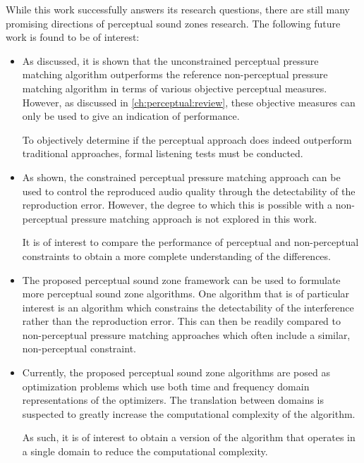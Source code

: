 While this work successfully answers its research questions, 
there are still many promising directions of perceptual sound zones research.
The following future work is found to be of interest:
\begin{itemize}
    \item As discussed, it is shown that the unconstrained perceptual pressure matching algorithm outperforms 
        the reference non-perceptual pressure matching algorithm in terms of various objective perceptual measures.
        However, as discussed in \autoref{ch:perceptual:review}, 
        these objective measures can only be used to give an indication of performance.

        To objectively determine if the perceptual approach does indeed outperform traditional approaches, 
        formal listening tests must be conducted.

    \item As shown, the constrained perceptual pressure matching approach can be used to control the 
        reproduced audio quality through the detectability of the reproduction error.
        However, the degree to which this is possible with a non-perceptual pressure matching approach
        is not explored in this work.

        It is of interest to compare the performance of perceptual and non-perceptual constraints to 
        obtain a more complete understanding of the differences.

    \item The proposed perceptual sound zone framework can be used to formulate more perceptual sound zone 
        algorithms.
        One algorithm that is of particular interest is an algorithm which constrains the detectability of 
        the interference rather than the reproduction error. 
        This can then be readily compared to non-perceptual pressure matching approaches which often 
        include a similar, non-perceptual constraint.

    \item Currently, the proposed perceptual sound zone algorithms are posed as optimization problems which use 
        both time and frequency domain representations of the optimizers.
        The translation between domains is suspected to greatly increase the computational complexity of the algorithm.

        As such, it is of interest to obtain a version of the algorithm that operates in a single domain to reduce 
        the computational complexity. 
\end{itemize}
